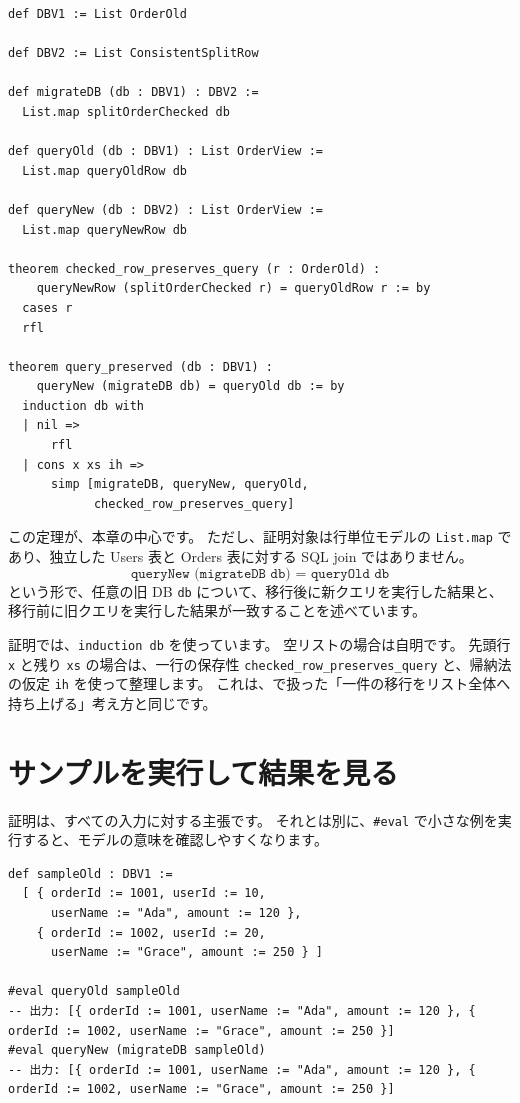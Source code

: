 \begin{listing}[htbp]
\begin{verbatim}
def DBV1 := List OrderOld

def DBV2 := List ConsistentSplitRow

def migrateDB (db : DBV1) : DBV2 :=
  List.map splitOrderChecked db

def queryOld (db : DBV1) : List OrderView :=
  List.map queryOldRow db

def queryNew (db : DBV2) : List OrderView :=
  List.map queryNewRow db

theorem checked_row_preserves_query (r : OrderOld) :
    queryNewRow (splitOrderChecked r) = queryOldRow r := by
  cases r
  rfl

theorem query_preserved (db : DBV1) :
    queryNew (migrateDB db) = queryOld db := by
  induction db with
  | nil =>
      rfl
  | cons x xs ih =>
      simp [migrateDB, queryNew, queryOld,
            checked_row_preserves_query]
\end{verbatim}
\caption{\texttt{query\_preserved}}
\label{lst:ch32-list-preservation}
\end{listing}

この定理が、本章の中心です。
ただし、証明対象は行単位モデルの \texttt{List.map} であり、独立した Users 表と Orders 表に対する SQL join ではありません。
\[
  \texttt{queryNew (migrateDB db) = queryOld db}
\]
という形で、任意の旧 DB \texttt{db} について、移行後に新クエリを実行した結果と、移行前に旧クエリを実行した結果が一致することを述べています。

証明では、\texttt{induction db} を使っています。
空リストの場合は自明です。
先頭行 \texttt{x} と残り \texttt{xs} の場合は、一行の保存性 \texttt{checked\_row\_preserves\_query} と、帰納法の仮定 \texttt{ih} を使って整理します。
これは、で扱った「一件の移行をリスト全体へ持ち上げる」考え方と同じです。

\section{サンプルを実行して結果を見る}

証明は、すべての入力に対する主張です。
それとは別に、\texttt{\#eval} で小さな例を実行すると、モデルの意味を確認しやすくなります。

\begin{listing}[htbp]
\begin{verbatim}
def sampleOld : DBV1 :=
  [ { orderId := 1001, userId := 10,
      userName := "Ada", amount := 120 },
    { orderId := 1002, userId := 20,
      userName := "Grace", amount := 250 } ]

#eval queryOld sampleOld
-- 出力: [{ orderId := 1001, userName := "Ada", amount := 120 }, { orderId := 1002, userName := "Grace", amount := 250 }]
#eval queryNew (migrateDB sampleOld)
-- 出力: [{ orderId := 1001, userName := "Ada", amount := 120 }, { orderId := 1002, userName := "Grace", amount := 250 }]
\end{verbatim}
\caption{\texttt{sampleOld}}
\label{lst:ch32-sample-eval}
\end{listing}

